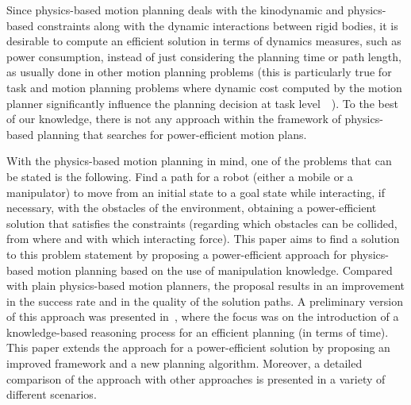 \documentclass[twocolumn]{svjour3}          %
\begin{document}
Since physics-based motion planning deals with the kinodynamic and physics-based
constraints along with the dynamic interactions between rigid bodies, it is desirable to compute an efficient solution in terms of dynamics measures, such as power consumption, instead of just considering the planning time or path length, as usually done in other motion planning problems (this is particularly true for task and motion planning problems where dynamic cost computed by the motion planner significantly influence the planning decision at task level~\cite{Ali2015}~\cite{RobotAli2015}). To the best of our knowledge, there is not any approach within the framework of physics-based planning that searches for power-efficient motion plans. 

With the physics-based motion planning in mind, one of the problems that can be stated is the following. Find a path for a robot (either a mobile or a manipulator) to move from an initial 
state to a goal state while interacting, if necessary, with the obstacles of the environment,  obtaining a power-efficient solution that satisfies the constraints (regarding which obstacles can be 
collided, from where and with which interacting force).
This paper aims to find a solution to this problem statement by proposing a power-efficient approach for physics-based motion planning based on the use of manipulation knowledge.
Compared with plain physics-based motion planners, the proposal results in an improvement in the success rate  and in the quality of the solution paths. A preliminary version of this approach was presented in~\cite{muhayyuddin2015}, where the focus was on the introduction of a knowledge-based reasoning process for an efficient planning (in terms of time). This paper extends the  approach for a power-efficient solution by proposing an improved framework and a new planning algorithm. Moreover, a detailed comparison of the approach with other approaches is presented in a variety of different scenarios.
\end{document}
